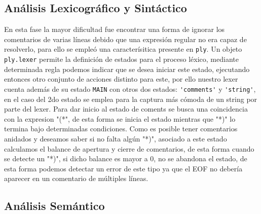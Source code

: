 \documentclass{article}
\begin{document}
\subsection{An\'alisis Lexicogr\'afico y Sint\'actico}

En esta fase la mayor dificultad fue encontrar una forma de ignorar los comentarios de varias l\'ineas debido que una expresi\'on regular no era capaz de resolverlo, para ello se emple\'o una caracter\'isitica presente en \verb|ply|. Un objeto \verb|ply.lexer| permite la definici\'on de estados para el proceso l\'exico, mediante determinada regla podemos indicar que se desea iniciar este estado, ejecutando entonces otro conjunto de acciones distinto para este, por ello nuestro lexer cuenta adem\'as de su estado \verb|MAIN| con otros dos estados: \verb|'comments'| y \verb|'string'|, en el caso del 2do estado se emplea para la captura m\'as c\'omoda de un string por parte del lexer. Para dar inicio al estado de coments se busca una coincidencia con la expresion "(*", de esta forma se inicia el estado mientras que "*)" lo termina bajo determinadas condiciones. Como es posible tener comentarios anidados y deseamos saber si no falta alg\'un "*)", asociado a este estado calculamos el balance de apertura y cierre de comentarios, de esta forma cuando se detecte un "*)", si dicho balance es mayor a 0, no se abandona el estado, de esta forma podemos detectar un error de este tipo ya que el EOF no deber\'ia aparecer en un comentario de m\'ultiples l\'ineas. 

\subsection{An\'alisis Sem\'antico}
\end{document}
